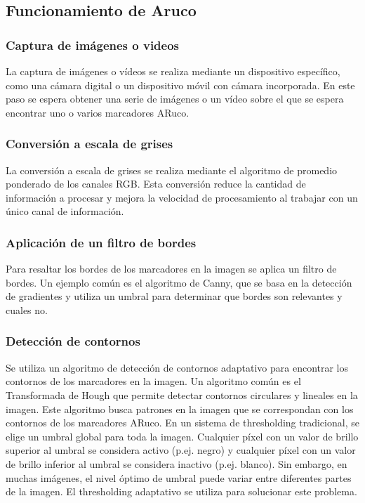 \subsection{Funcionamiento de Aruco}

\subsubsection*{Captura de imágenes o videos}
La captura de imágenes o vídeos se realiza mediante un dispositivo específico, como una cámara digital o un dispositivo móvil con cámara incorporada. En este paso se espera obtener una serie de imágenes o un vídeo sobre el que se espera encontrar uno o varios marcadores ARuco.
\subsubsection*{Conversión a escala de grises}
La conversión a escala de grises se realiza mediante el algoritmo de promedio ponderado de los canales RGB. Esta conversión reduce la cantidad de información a procesar y mejora la velocidad de procesamiento al trabajar con un único canal de información.
\subsubsection*{Aplicación de un filtro de bordes}
Para resaltar los bordes de los marcadores en la imagen se aplica un filtro de bordes. Un ejemplo común es el algoritmo de Canny, que se basa en la detección de gradientes y utiliza un umbral para determinar que bordes son relevantes y cuales no.
\subsubsection*{Detección de contornos}
Se utiliza un algoritmo de detección de contornos adaptativo para encontrar los contornos de los marcadores en la imagen. Un algoritmo común es el Transformada de Hough que permite detectar contornos circulares y lineales en la imagen. Este algoritmo busca patrones en la imagen que se correspondan con los contornos de los marcadores ARuco.
En un sistema de thresholding tradicional, se elige un umbral global para toda la imagen. Cualquier píxel con un valor de brillo superior al umbral se considera activo (p.ej. negro) y cualquier píxel con un valor de brillo inferior al umbral se considera inactivo (p.ej. blanco). Sin embargo, en muchas imágenes, el nivel óptimo de umbral puede variar entre diferentes partes de la imagen. El thresholding adaptativo se utiliza para solucionar este problema.

